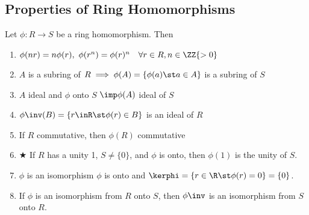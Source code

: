 \subsection{Properties of Ring Homomorphisms}
\begin{theorem}
  Let \( \phi: R\to S \) be a ring homomorphism. Then
  \begin{enumerate}
    \item \( \phi(nr) = n\phi(r),\  \phi(r^n) = \phi(r)^n \quad \forall r\in R, n\in \ZZ{>0} \)
    \item \( A \) is a subring of \( R \implies  \phi(A) = \{\phi(a) \st a\in A\} \) is a subring of \( S \)
    \item \( A \) ideal and \( \phi \) onto \( S \) \( \imp \phi(A) \) ideal of \( S \)
    \item \( \phi\inv(B) = \{r\inR \st \phi(r) \in B \} \) is an ideal of \( R \)
    \item If \( R \) commutative, then \( \phi(R) \) commutative
    \item \hspace{-2.75em}$\bigstar$\hspace{1.5em} If \( R \) has a unity 1, \( S\neq \{0\} \), and \( \phi \) is onto, then \( \phi(1) \) is the unity of \( S \).
    \item \( \phi \) is an isomorphism \iff \( \phi \) is onto and \( \kerphi = \{r\in\R \st \phi(r) = 0\} = \{0\} \).
    \item If \( \phi \) is an isomorphism from \( R \) onto \( S \), then \( \phi\inv \) is an isomorphism from \( S \) onto \( R \).
  \end{enumerate}
\end{theorem}